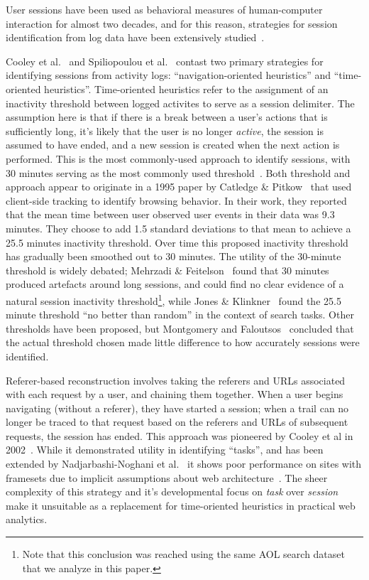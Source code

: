 User sessions have been used as behavioral measures of human-computer interaction for almost two decades, and for this reason, strategies for session identification from log data have been extensively studied~\cite{eickhoff2014lessons}.

Cooley et al.~\cite{cooley1999data} and Spiliopoulou et al.~\cite{spiliopoulou2003framework} contast two primary strategies for identifying sessions from activity logs: ``navigation-oriented heuristics'' and ``time-oriented heuristics''.  Time-oriented heuristics refer to the assignment of an inactivity threshold between logged activites to serve as a session delimiter.  The assumption here is that if there is a break between a user's actions that is sufficiently long, it's likely that the user is no longer \emph{active}, the session is assumed to have ended, and a new session is created when the next action is performed. This is the most commonly-used approach to identify sessions, with 30 minutes serving as the most commonly used threshold~\cite{eickhoff2014lessons,spiliopoulou2003framework,ortega2010differences}.  Both threshold and approach appear to originate in a 1995 paper by Catledge \& Pitkow~\cite{catledge1995characterizing} that used client-side tracking to identify browsing behavior. In their work, they reported that the mean time between user observed user events in their data was 9.3 minutes.  They choose to add 1.5 standard deviations to that mean to achieve a 25.5 minutes inactivity threshold.  Over time this proposed inactivity threshold has gradually been smoothed out to 30 minutes.  The utility of the 30-minute threshold is widely debated; Mehrzadi \& Feitelson~\cite{mehrzadi2012onextracting} found that 30 minutes produced artefacts around long sessions, and could find no clear evidence of a natural session inactivity threshold\footnote{Note that this conclusion was reached using the same AOL search dataset that we analyze in this paper.}, while Jones \& Klinkner~\cite{jones2008beyond} found the 25.5 minute threshold ``no better than random'' in the context of search tasks. Other thresholds have been proposed, but Montgomery and Faloutsos~\cite{montgomery2001identifying} concluded that the actual threshold chosen made little difference to how accurately sessions were identified.

Referer-based reconstruction involves taking the referers and URLs associated with each request by a user, and chaining them together. When a user begins navigating (without a referer), they have started a session; when a trail can no longer be traced to that request based on the referers and URLs of subsequent requests, the session has ended.  This approach was pioneered by Cooley et al in 2002~\cite{cooley1999data}.  While it demonstrated utility in identifying ``tasks'', and has been extended by Nadjarbashi-Noghani et al.~\cite{nadjarbashi2004improving} it shows poor performance on sites with framesets due to implicit assumptions about web architecture~\cite{berendt2003impact}. The sheer complexity of this strategy and it's developmental focus on \emph{task} over \emph{session} make it unsuitable as a replacement for time-oriented heuristics in practical web analytics.

